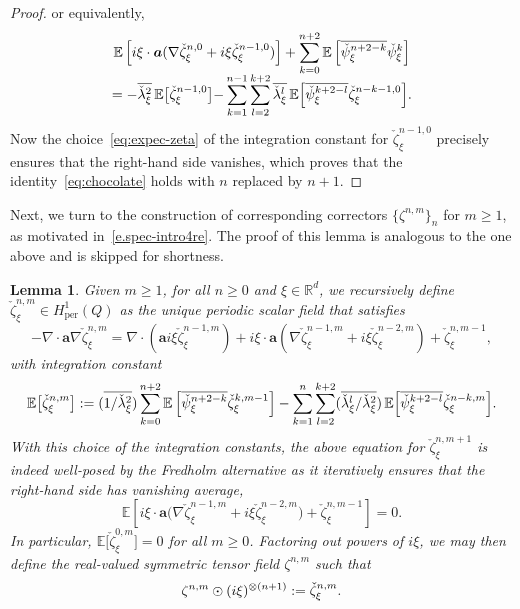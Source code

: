 \documentclass[JEP,XML,SOM,Unicode,published]{cedram}
\theoremstyle{plain}
\newtheorem{lem0}[theor0]{Lemma}
\newenvironment{lem}
{\renewcommand{\qedsymbol}{$\lozenge$}\pushQED{\qed}\begin{lem0}}
{\popQED\end{lem0}}
\theoremstyle{definition}
\numberwithin{equation}{section}
\newcommand{\R}{\mathbb R}
\newcommand{\per}{{\operatorname{per}}}
\newcommand{\Aa}{\boldsymbol a}
\newcommand{\expec}[1]{\mathbb{E}\left[ #1 \right]}
\newcommand{\Bexpec}[1]{\mathbb{E}\Bigl[ #1 \Bigr]}
\newcommand{\expecm}[1]{\mathbb{E}\bigl[ #1 \bigr]}\let\bexpec\expecm
\begin{document}
\begin{proof}
or equivalently,\vspace*{-3pt}
\begin{multline*}
\expec{i\xi \cdot \Aa(\nabla \check\zeta_\xi^{n,0}+i\xi\check\zeta_\xi^{n-1,0})}+\sum_{k=0}^{n+2}\expec{\overline{\check \psi_\xi^{n+2-k}}\check\psi_\xi^{k}}\\[-5pt]
={-}\overline{\check \lambda_\xi^2}\,\expecm{\check\zeta_\xi^{n-1,0}}
{-}\sum_{k=1}^{n-1}\sum_{l=2}^{k+2}\overline{\check \lambda_\xi^l}\,\Bexpec{ \overline{\check \psi_\xi^{k+2-l}}\check\zeta_\xi^{n-k-1,0}}.
\end{multline*}
Now the choice~\eqref{eq:expec-zeta} of the integration constant for $\check\zeta_\xi^{n-1,0}$ precisely ensures that the right-hand side vanishes, which proves that the identity~\eqref{eq:chocolate} holds with $n$ replaced by $n+1$.
\end{proof}

Next, we turn to the construction of corresponding correctors $\{\zeta^{n,m}\}_{n}$ for $m\ge1$, as motivated in~\eqref{e.spec-intro4re}. The proof of this lemma is analogous to the one above and is skipped for shortness.

\begin{lem}\label{lem:spec-corr-zeta-2}
Given $m\ge1$, for all $n\ge0$ and $\xi\in\R^d$, we recursively define $\check\zeta^{n,m}_\xi\in H^1_{{\per}}(Q)$ as the unique periodic scalar field that satisfies\vspace*{-3pt}
\begin{equation}\label{e.zetajn}
-\nabla\cdot\Aa\nabla\check\zeta^{n,m}_\xi=
\nabla\cdot(\Aa i\xi\check\zeta^{n-1,m}_\xi)+
i\xi\cdot\Aa(\nabla\check\zeta^{n-1,m}_\xi+i\xi\check\zeta^{n-2,m}_\xi)+\check\zeta^{n,m-1}_\xi,
\end{equation}
with integration constant\vspace*{-4pt}\enlargethispage{.3\baselineskip}
\[\expecm{\check\zeta^{n,m}_\xi}:=(\overline{1/\check\lambda_\xi^2})\sum_{k=0}^{n+2}\expec{\overline{\check\psi^{n+2-k}_\xi}\check\zeta^{k,m-1}_\xi}-\sum_{k=1}^{n}\sum_{l=2}^{k+2}(\overline{\check\lambda_\xi^l/\check\lambda_\xi^2})\,\Bexpec{\overline{\check\psi^{k+2-l}_\xi}\check\zeta^{n-k,m}_\xi}.\]
With this choice of the integration constants, the above equation for $\check\zeta^{n,m+1}_\xi$ is indeed well-posed by the Fredholm alternative as it iteratively ensures that the right-hand side has vanishing average,\vspace*{-3pt}
\begin{equation}\label{eq:chocolate-2}
\expec{i\xi\cdot\Aa\big(\nabla\check\zeta^{n-1,m}_\xi+i\xi\check\zeta^{n-2,m}_\xi\big)+\check\zeta^{n,m-1}_\xi}=0.
\end{equation}
In particular, $\expecm{\check\zeta_\xi^{0,m}}=0$ for all $m\ge0$.
{Factoring out powers of $i\xi$,} we may then define the real-valued symmetric tensor field $\zeta^{n,m}$ such that\vspace*{-3pt}
\[\zeta^{n,m} \odot (i\xi)^{\otimes (n+1)}:=\check\zeta^{n,m}_{\xi}.\qedhere\]
\end{lem}
\end{document}
